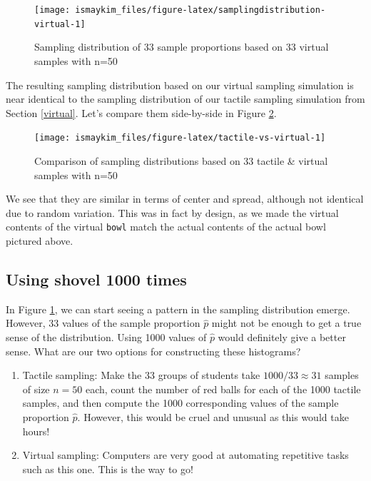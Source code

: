 \documentclass[12pt,]{krantz}
\providecommand{\tightlist}{%
  \setlength{\itemsep}{0pt}\setlength{\parskip}{0pt}}
\begin{document}
\begin{figure}

{\centering \texttt{[image: ismaykim\_files/figure-latex/samplingdistribution-virtual-1]} 

}

\caption{Sampling distribution of 33 sample proportions based on 33 virtual samples with n=50}\label{fig:samplingdistribution-virtual}
\end{figure}

The resulting sampling distribution based on our virtual sampling
simulation is near identical to the sampling distribution of our tactile
sampling simulation from Section \ref{virtual}. Let's compare them
side-by-side in Figure \ref{fig:tactile-vs-virtual}.




\begin{figure}

{\centering \texttt{[image: ismaykim\_files/figure-latex/tactile-vs-virtual-1]} 

}

\caption{Comparison of sampling distributions based on 33
tactile \& virtual samples with n=50}\label{fig:tactile-vs-virtual}
\end{figure}

We see that they are similar in terms of center and spread, although not
identical due to random variation. This was in fact by design, as we
made the virtual contents of the virtual \texttt{bowl} match the actual
contents of the actual bowl pictured above.

\subsection{Using shovel 1000 times}\label{using-shovel-1000-times}

In Figure \ref{fig:samplingdistribution-virtual}, we can start seeing a
pattern in the sampling distribution emerge. However, 33 values of the
sample proportion \(\widehat{p}\) might not be enough to get a true
sense of the distribution. Using 1000 values of \(\widehat{p}\) would
definitely give a better sense. What are our two options for
constructing these histograms?

\begin{enumerate}
\def\labelenumi{\arabic{enumi}.}
\tightlist
\item
  Tactile sampling: Make the 33 groups of students take
  \(1000 / 33 \approx 31\) samples of size \(n=50\) each, count the
  number of red balls for each of the 1000 tactile samples, and then
  compute the 1000 corresponding values of the sample proportion
  \(\widehat{p}\). However, this would be cruel and unusual as this
  would take hours!
\item
  Virtual sampling: Computers are very good at automating repetitive
  tasks such as this one. This is the way to go!
\end{enumerate}
\end{document}
